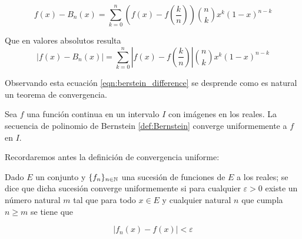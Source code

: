 \begin{equation}
    f(x)-B_n(x) = \sum_{k=0}^n \left(f(x) - f \left( \frac{k}{n} \right)\right)
    \binom{n}{k} x^{k} (1-x)^{n-k}
\end{equation} 

Que en valores absolutos resulta 
\begin{equation} \label{eqn:berstein_difference}
    |f(x)-B_n(x)| = \sum_{k=0}^n \left|f(x) - f \left( \frac{k}{n} \right)\right|
    \binom{n}{k} x^{k} (1-x)^{n-k}
\end{equation} 

Observando esta ecuación \ref{eqn:berstein_difference} se desprende como es natural un teorema de convergencia. 

\begin{teorema}\label{teo:aproximacion_bernstein}

    Sea $f$ una función continua en un intervalo $I$ con imágenes en los reales. 
    La secuencia de polinomio de Bernstein
    \ref{def:Bernstein} converge uniformemente a $f$ en $I.$
    
\end{teorema}
Recordaremos antes la definición de convergencia uniforme: 

\begin{definicion}

    Dado $E$ un conjunto y $\{f_n\}_{n \in \mathbb{N}}$ una sucesión de funciones de $E$
     a los reales; se dice 
    que dicha sucesión converge uniformemente si para cualquier $\varepsilon > 0$ existe un número natural $m$ tal que 
    para todo $x   \in E$ y cualquier natural $n$ que cumpla $n \geq m$ se tiene que 

    \begin{equation*}
        |f_n(x) - f(x) | < \varepsilon
    \end{equation*}
    
\end{definicion}

